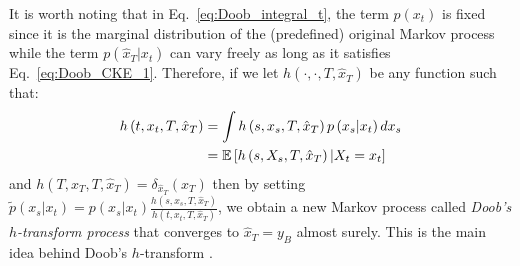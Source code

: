 It is worth noting that in Eq.~\ref{eq:Doob_integral_t}, the term
$p\left(x_{t}\right)$ is fixed since it is the marginal distribution
of the (predefined) original Markov process while the term $p\left(\hat{x}_{T}|x_{t}\right)$
can vary freely as long as it satisfies Eq.~\ref{eq:Doob_CKE_1}.
Therefore, if we let $h\left(\cdot,\cdot,T,\hat{x}_{T}\right)$ be
any function such that:
\begin{align}
h\left(t,x_{t},T,\hat{x}_{T}\right) & =\int h\left(s,x_{s},T,\hat{x}_{T}\right)p\left(x_{s}|x_{t}\right)dx_{s}\label{eq:Doob_h_CKE_1}\\
 & =\mathbb{E}\left[h\left(s,X_{s},T,\hat{x}_{T}\right)|X_{t}=x_{t}\right]\label{eq:Doob_h_CKE_2}
\end{align}
and $h\left(T,x_{T},T,\hat{x}_{T}\right)=\delta_{\hat{x}_{T}}\left(x_{T}\right)$
then by setting $\tilde{p}\left(x_{s}|x_{t}\right)=p\left(x_{s}|x_{t}\right)\frac{h\left(s,x_{s},T,\hat{x}_{T}\right)}{h\left(t,x_{t},T,\hat{x}_{T}\right)}$,
we obtain a new Markov process called \emph{Doob's $h$-transform
process} that converges to $\hat{x}_{T}=y_{B}$ almost surely. This
is the main idea behind Doob's $h$-transform \cite{doob1984classical}.

